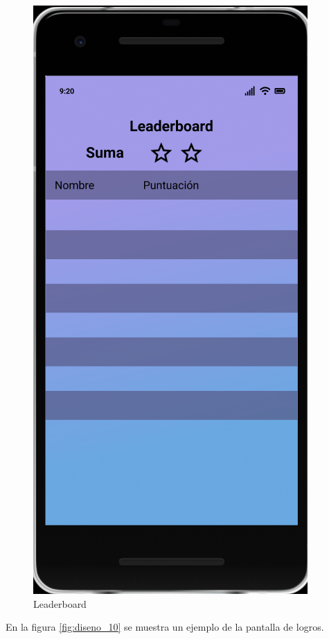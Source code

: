 \documentclass{article}
\begin{document}
\begin{figure}[H]
    \centering
    \includegraphics[scale=0.8]{imgs/Figma/Leaderboard}
    \caption{Leaderboard}
    \label{fig:diseno_09}
\end{figure}

En la figura \ref{fig:diseno_10} se muestra un ejemplo de la pantalla de logros.
\end{document}
